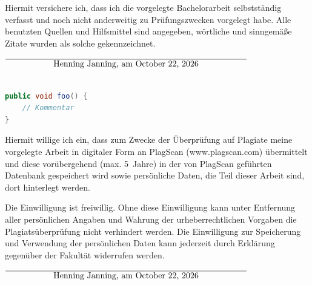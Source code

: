 \documentclass[12pt,oneside,a4paper,parskip]{scrbook}
\def\BaAuthor{Henning Janning}
\begin{document}


Hiermit versichere ich, dass ich die vorgelegte Bachelorarbeit selbstständig verfasst und noch nicht anderweitig zu Prüfungszwecken vorgelegt habe. Alle benutzten Quellen und Hilfsmittel sind angegeben, wörtliche und sinngemäße Zitate wurden als solche gekennzeichnet.

\vspace{20pt}
\begin{flushright}
$\overline{~~~~~~~~~~~~~~~~~\mbox{\BaAuthor, am \today}~~~~~~~~~~~~~~~~~}$
\end{flushright}

\begin{lstlisting}[label=lst:java,
				   language=java,
				   firstnumber=1,
				   caption=Beispiel für einen Quelltext]

public void foo() {
	// Kommentar
}
\end{lstlisting}








Hiermit willige ich ein, dass zum Zwecke der Überprüfung auf Plagiate meine vorgelegte Arbeit in digitaler Form an PlagScan (www.plagscan.com) übermittelt und diese vorübergehend (max. 5~Jahre) in der von PlagScan geführten Datenbank gespeichert wird sowie persönliche Daten, die Teil dieser Arbeit sind, dort hinterlegt werden.

\begin{small}
Die Einwilligung ist freiwillig. Ohne diese Einwilligung kann unter Entfernung aller persönlichen Angaben und Wahrung der urheberrechtlichen Vorgaben die Plagiatsüberprüfung nicht verhindert werden. Die Einwilligung zur Speicherung und Verwendung der persönlichen Daten kann jederzeit durch Erklärung gegenüber der Fakultät widerrufen werden.
\end{small}

\vspace{20pt}
\begin{flushright}
$\overline{~~~~~~~~~~~~~~~~~\mbox{\BaAuthor, am \today}~~~~~~~~~~~~~~~~~}$
\end{flushright}
\end{document}

